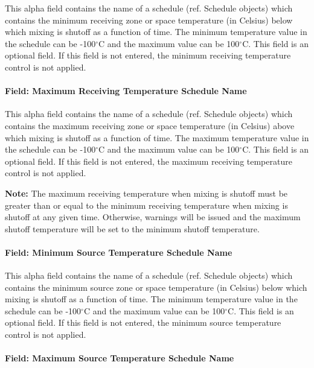 This alpha field contains the name of a schedule (ref. Schedule objects) which contains the minimum receiving zone or space temperature (in Celsius) below which mixing is shutoff as a function of time. The minimum temperature value in the schedule can be -100$^\circ$C and the maximum value can be 100$^\circ$C. This field is an optional field. If this field is not entered, the minimum receiving temperature control is not applied.

\paragraph{Field: Maximum Receiving Temperature Schedule Name}\label{field-maximum-zone-temperature-schedule-name}

This alpha field contains the name of a schedule (ref. Schedule objects) which contains the maximum receiving zone or space temperature (in Celsius) above which mixing is shutoff as a function of time. The maximum temperature value in the schedule can be -100$^\circ$C and the maximum value can be 100$^\circ$C. This field is an optional field. If this field is not entered, the maximum receiving temperature control is not applied.

\textbf{Note:} The maximum receiving temperature when mixing is shutoff must be greater than or equal to the minimum receiving temperature when mixing is shutoff at any given time. Otherwise, warnings will be issued and the maximum shutoff temperature will be set to the minimum shutoff temperature.

\paragraph{Field: Minimum Source Temperature Schedule Name}\label{field-minimum-source-zone-temperature-schedule-name}

This alpha field contains the name of a schedule (ref. Schedule objects) which contains the minimum source zone or space temperature (in Celsius) below which mixing is shutoff as a function of time. The minimum temperature value in the schedule can be -100$^\circ$C and the maximum value can be 100$^\circ$C. This field is an optional field. If this field is not entered, the minimum source temperature control is not applied.

\paragraph{Field: Maximum Source Temperature Schedule Name}\label{field-maximum-source-zone-temperature-schedule-name}

